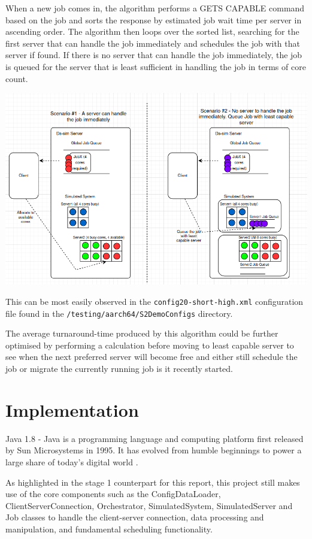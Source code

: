 \documentclass[a4paper]{article}
\begin{document}
When a new job comes in, the algorithm performs a GETS CAPABLE command based on the job and sorts the response by estimated job wait time per server in ascending order. The algorithm then loops over the sorted list, searching for the first server that can handle the job immediately and schedules the job with that server if found. If there is no server that can handle the job immediately, the job is queued for the server that is least sufficient in handling the job in terms of core count.

\begin{center}
    \includegraphics[scale=0.3]{images/job-scheduling.png}
\end{center}

This can be most easily observed in the \verb|config20-short-high.xml| configuration file found in the \verb|/testing/aarch64/S2DemoConfigs| directory.

The average turnaround-time produced by this algorithm could be further optimised by performing a calculation before moving to least capable server to see when the next preferred server will become free and either still schedule the job or migrate the currently running job is it recently started.

\section{Implementation}
\label{sec:section4}
Java 1.8 - Java is a programming language and computing platform first released by Sun Microsystems in 1995. It has evolved from humble beginnings to power a large share of today’s digital world \cite{java}.

As highlighted in the stage 1 counterpart for this report, this project still makes use of the core components such as the ConfigDataLoader, ClientServerConnection, Orchestrator, SimulatedSystem, SimulatedServer and Job classes to handle the client-server connection, data processing and manipulation, and fundamental scheduling functionality. 
\end{document}
